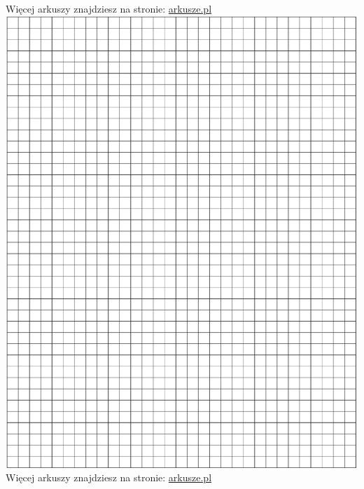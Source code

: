 \documentclass[10pt]{article}
\begin{document}
Więcej arkuszy znajdziesz na stronie: \href{http://arkusze.pl}{arkusze.pl}\\
\includegraphics[max width=\textwidth, center]{2024_11_21_5abc0108fbbc287103ecg-16}\\
Więcej arkuszy znajdziesz na stronie: \href{http://arkusze.pl}{arkusze.pl}\\
\end{document}
